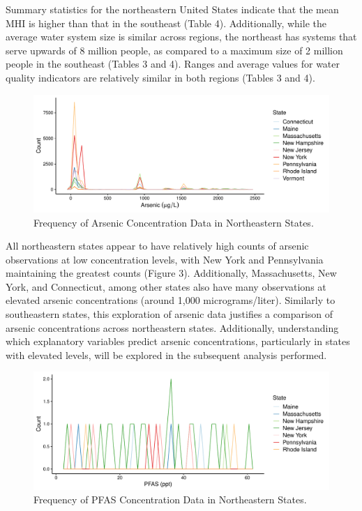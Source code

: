 \documentclass[12pt,]{article}
\begin{document}
Summary statistics for the northeastern United States indicate that the
mean MHI is higher than that in the southeast (Table 4). Additionally,
while the average water system size is similar across regions, the
northeast has systems that serve upwards of 8 million people, as
compared to a maximum size of 2 million people in the southeast (Tables
3 and 4). Ranges and average values for water quality indicators are
relatively similar in both regions (Tables 3 and 4).

\begin{figure}
\centering
\includegraphics{Project_Template_files/figure-latex/figs3-1.pdf}
\caption{Frequency of Arsenic Concentration Data in Northeastern
States.}
\end{figure}

All northeastern states appear to have relatively high counts of arsenic
observations at low concentration levels, with New York and Pennsylvania
maintaining the greatest counts (Figure 3). Additionally, Massachusetts,
New York, and Connecticut, among other states also have many
observations at elevated arsenic concentrations (around 1,000
micrograms/liter). Similarly to southeastern states, this exploration of
arsenic data justifies a comparison of arsenic concentrations across
northeastern states. Additionally, understanding which explanatory
variables predict arsenic concentrations, particularly in states with
elevated levels, will be explored in the subsequent analysis performed.

\newpage

\begin{figure}
\centering
\includegraphics{Project_Template_files/figure-latex/figs4-1.pdf}
\caption{Frequency of PFAS Concentration Data in Northeastern States.}
\end{figure}
\end{document}
